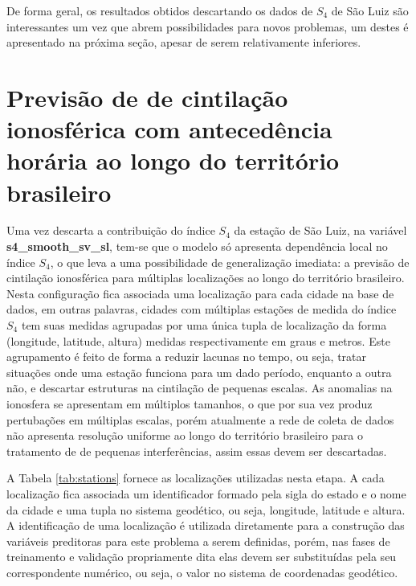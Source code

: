 De forma geral, os resultados obtidos descartando os dados de $S_4$ de São Luiz são interessantes um vez que abrem possibilidades para novos problemas, um destes é apresentado na próxima seção, apesar de serem relativamente inferiores.


\section{Previsão de de cintilação ionosférica com antecedência horária ao longo do território brasileiro}\label{sec:bra}

Uma vez descarta a contribuição do índice $S_4$ da estação de São Luiz, na variável {\bf s4\_smooth\_sv\_sl}, tem-se que o modelo só apresenta dependência local no índice $S_4$, o que leva a uma possibilidade de generalização imediata: a previsão de cintilação ionosférica para múltiplas localizações ao longo do território brasileiro. Nesta configuração fica associada uma localização para cada cidade na base de dados, em outras palavras, cidades com múltiplas estações de medida do índice $S_4$ tem suas medidas agrupadas por uma única tupla de localização da forma (longitude, latitude, altura) medidas respectivamente em graus e metros. Este agrupamento é feito de forma a reduzir lacunas no tempo, ou seja, tratar situações onde uma estação funciona para um dado período, enquanto a outra não, e descartar estruturas na cintilação de pequenas escalas. As anomalias na ionosfera se apresentam em múltiplos tamanhos, o que por sua vez produz pertubações em múltiplas escalas, porém atualmente a rede de coleta de dados não apresenta resolução uniforme ao longo do território brasileiro para o tratamento de de pequenas interferências, assim essas devem ser descartadas.

A Tabela \ref{tab:stations} fornece as localizações utilizadas nesta etapa. A cada localização fica associada um identificador formado pela sigla do estado e o nome da cidade e uma tupla no sistema geodético, ou seja, longitude, latitude e altura. A identificação de uma localização é utilizada diretamente para a construção das variáveis preditoras para este problema a serem definidas, porém, nas fases de treinamento e validação propriamente dita elas devem ser substituídas pela seu correspondente numérico, ou seja, o valor no sistema de coordenadas geodético.

